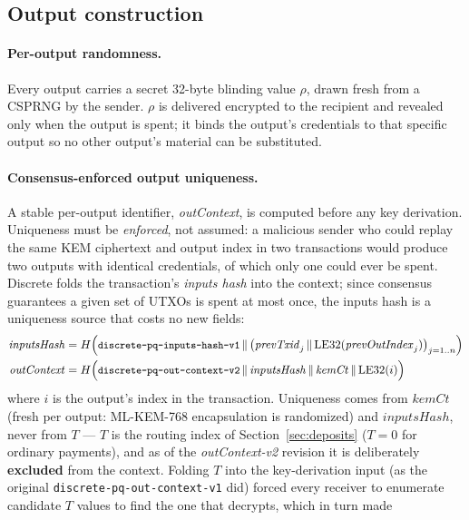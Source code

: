 \documentclass[11pt,a4paper]{article}
\newcommand{\code}[1]{\texttt{\small #1}}
\newcommand{\concat}{\,\|\,}
\begin{document}
\subsection{Output construction}\label{sec:output}

\paragraph{Per-output randomness.}
Every output carries a secret 32-byte blinding value $\rho$, drawn fresh from
a CSPRNG by the sender. $\rho$ is delivered encrypted to the recipient and
revealed only when the output is spent; it binds the output's credentials to
that specific output so no other output's material can be substituted.

\paragraph{Consensus-enforced output uniqueness.}
A stable per-output identifier, \emph{outContext}, is computed before any key
derivation. Uniqueness must be \emph{enforced}, not assumed: a malicious
sender who could replay the same KEM ciphertext and output index in two
transactions would produce two outputs with identical credentials, of which
only one could ever be spent. Discrete folds the transaction's
\emph{inputs hash} into the context; since consensus guarantees a given set
of UTXOs is spent at most once, the inputs hash is a uniqueness source that
costs no new fields:
\begin{align}
\mathit{inputsHash} &= H\Bigl(\text{\code{discrete-pq-inputs-hash-v1}}
  \concat \bigl(\mathit{prevTxid}_j \concat \mathrm{LE32}(\mathit{prevOutIndex}_j)\bigr)_{j=1..n}\Bigr) \\
\mathit{outContext} &= H\Bigl(\text{\code{discrete-pq-out-context-v2}}
  \concat \mathit{inputsHash} \concat \mathit{kemCt}
  \concat \mathrm{LE32}(i)\Bigr)
\label{eq:outcontext}
\end{align}
where $i$ is the output's index in the transaction. Uniqueness comes from
$\mathit{kemCt}$ (fresh per output: ML-KEM-768 encapsulation is randomized)
and $\mathit{inputsHash}$, never from $T$ --- $T$ is the routing index of
Section~\ref{sec:deposits} ($T{=}0$ for ordinary payments), and as of the
\emph{outContext-v2} revision it is deliberately \textbf{excluded} from the
context. Folding $T$ into the key-derivation input (as the original
\code{discrete-pq-out-context-v1} did) forced every receiver to enumerate
candidate $T$ values to find the one that decrypts, which in turn made
\end{document}
